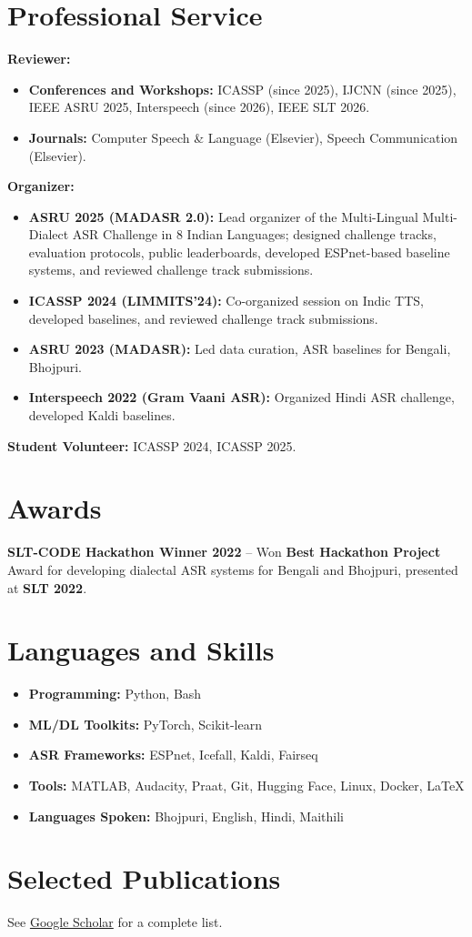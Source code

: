 \documentclass[letterpaper,11pt]{article}
\begin{document}
\section{Professional Service}

\textbf{Reviewer:}
\begin{itemize}
    \item \textbf{Conferences and Workshops:} ICASSP (since 2025), IJCNN (since 2025), IEEE ASRU 2025, Interspeech (since 2026), IEEE SLT 2026.
    \item \textbf{Journals:} Computer Speech \& Language (Elsevier), Speech Communication (Elsevier).
\end{itemize}

\textbf{Organizer:}  
\begin{itemize}
    \item \textbf{ASRU 2025 (MADASR 2.0):} Lead organizer of the Multi-Lingual Multi-Dialect ASR Challenge in 8 Indian Languages; designed challenge tracks, evaluation protocols, public leaderboards, developed ESPnet-based baseline systems, and reviewed challenge track submissions.
    \item \textbf{ICASSP 2024 (LIMMITS’24):} Co-organized session on Indic TTS, developed baselines, and reviewed challenge track submissions.
    \item \textbf{ASRU 2023 (MADASR):} Led data curation, ASR baselines for Bengali, Bhojpuri.
    \item \textbf{Interspeech 2022 (Gram Vaani ASR):} Organized Hindi ASR challenge, developed Kaldi baselines.
\end{itemize}

\textbf{Student Volunteer:} ICASSP 2024, ICASSP 2025.  
  

\section{Awards}
\textbf{SLT-CODE Hackathon Winner 2022} – Won \textbf{Best Hackathon Project} Award for developing dialectal ASR systems for Bengali and Bhojpuri, presented at \textbf{SLT 2022}.

\section{Languages and Skills}
\begin{itemize}[nosep]
    \item \textbf{Programming:} Python, Bash
    \item \textbf{ML/DL Toolkits:} PyTorch, Scikit-learn
    \item \textbf{ASR Frameworks:} ESPnet, Icefall, Kaldi, Fairseq
    \item \textbf{Tools:} MATLAB, Audacity, Praat, Git, Hugging Face, Linux, Docker, \LaTeX
    \item \textbf{Languages Spoken:} Bhojpuri, English, Hindi, Maithili
\end{itemize}

\section{Selected Publications}
{\small See \href{https://scholar.google.com/citations?user=soOjpoYAAAAJ}{Google Scholar} for a complete list.}
\printbibliography[heading=none]
\end{document}
